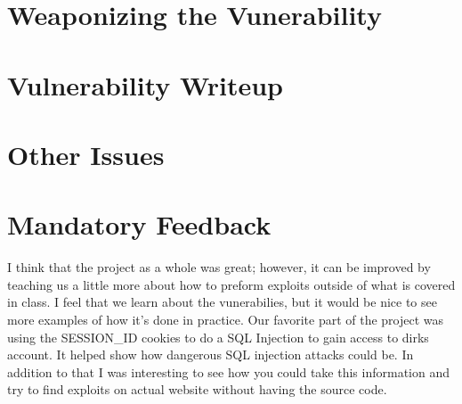 \documentclass[12pt]{article}
\begin{document}
\maketitle

\section{Weaponizing the Vunerability}

\section{Vulnerability Writeup}

\section{Other Issues}

\section{Mandatory Feedback}
I think that the project as a whole was great; however, it can be improved by teaching us a little more about how to preform exploits outside of what is covered in class. I feel that we learn about the vunerabilies, but it would be nice to see more examples of how it's done in practice. Our favorite part of the project was using the SESSION\_ID cookies to do a SQL Injection to gain access to dirks account. It helped show how dangerous SQL injection attacks could be. In addition to that I was interesting to see how you could take this information and try to find exploits on actual website without having the source code.
\end{document}
